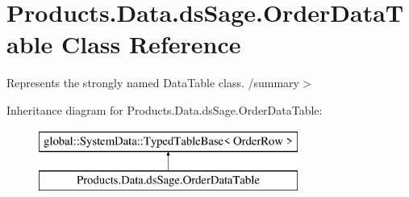 \hypertarget{class_products_1_1_data_1_1ds_sage_1_1_order_data_table}{}\section{Products.\+Data.\+ds\+Sage.\+Order\+Data\+Table Class Reference}
\label{class_products_1_1_data_1_1ds_sage_1_1_order_data_table}


Represents the strongly named Data\+Table class. /summary$>$  


Inheritance diagram for Products.\+Data.\+ds\+Sage.\+Order\+Data\+Table\+:\begin{figure}[H]
\begin{center}
\leavevmode
\includegraphics[height=2.000000cm]{class_products_1_1_data_1_1ds_sage_1_1_order_data_table}
\end{center}
\end{figure}
